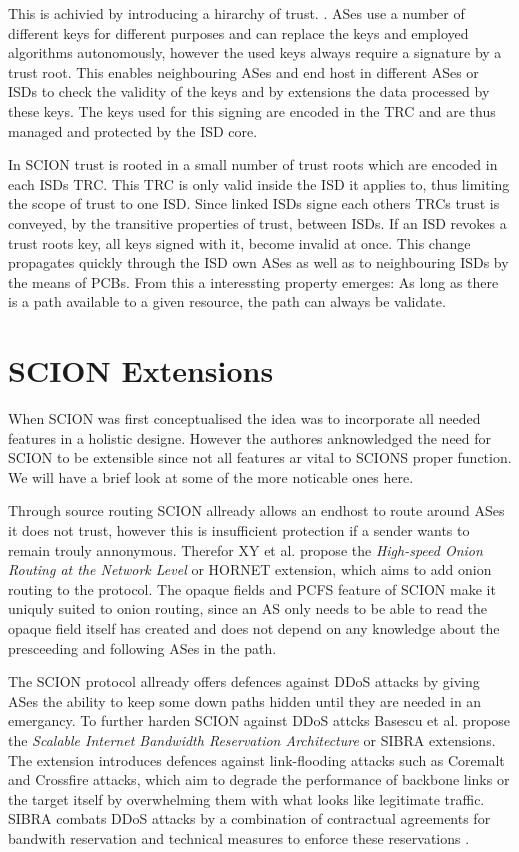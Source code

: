 \documentclass[../eva1_scion.tex]{subfiles}
\begin{document}
    This is achivied by introducing a hirarchy of trust. \cite{scion_2011}. ASes use a number of different keys for different purposes and can replace the keys and employed algorithms autonomously, however the used keys always require a signature by a trust root. This enables neighbouring ASes and end host in different ASes or ISDs to check the validity of the keys and by extensions the data processed by these keys. The keys used for this signing are encoded in the TRC and are thus managed and protected by the ISD core.

    In SCION trust is rooted in a small number of trust roots which are encoded in each ISDs TRC. This TRC is only valid inside the ISD it applies to, thus limiting the scope of trust to one ISD. Since linked ISDs signe each others TRCs trust is conveyed, by the transitive properties of trust, between ISDs. If an ISD revokes a trust roots key, all keys signed with it, become invalid at once. This change propagates quickly through the ISD own ASes as well as to neighbouring ISDs by the means of PCBs. From this a interessting property emerges: As long as there is a path available to a given resource, the path can always be validate.

    \section{SCION Extensions}
    When SCION was first conceptualised the idea was to incorporate all needed features in a holistic designe. However the authores anknowledged the need for SCION to be extensible since not all features ar vital to SCIONS proper function. We will have a brief look at some of the more noticable ones here.

    Through source routing SCION allready allows an endhost to route around ASes it does not trust, however this is insufficient protection if a sender wants to remain trouly annonymous. Therefor XY et al. propose the \textit{High-speed Onion Routing at the Network Level} \cite{hornet} or HORNET extension, which aims to add onion routing \cite{onion_routing} to the protocol. The opaque fields and PCFS feature of SCION make it uniquly suited to onion routing, since an AS only needs to be able to read the opaque field itself has created and does not depend on any knowledge about the presceeding and following ASes in the path.

    The SCION protocol allready offers defences against DDoS attacks by giving ASes the ability to keep some down paths hidden until they are needed in an emergancy. To further harden SCION against DDoS attcks Basescu et al. propose the \textit{Scalable Internet Bandwidth Reservation Architecture} \cite{sibra} or SIBRA extensions. The extension introduces defences against link-flooding attacks such as Coremalt \cite{coremelt} and Crossfire \cite{crossfire} attacks, which aim to degrade the performance of backbone links or the target itself by overwhelming them with what looks like legitimate traffic. SIBRA combats DDoS attacks by a combination of contractual agreements for bandwith reservation and technical measures to enforce these reservations \cite{sibra}.
\end{document}
